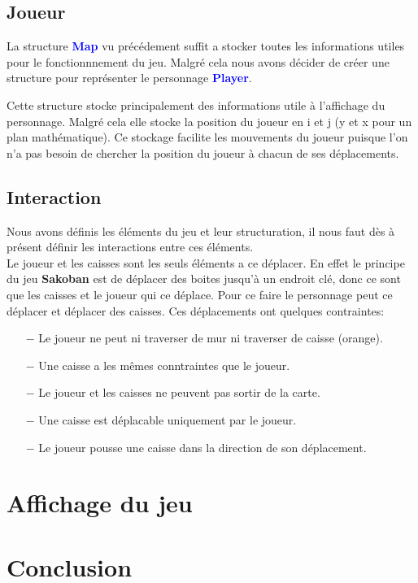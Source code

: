 \documentclass[french, 12pt]{article}
\begin{document}
    \subsection{Joueur}
        La structure \textcolor{blue}{\textbf{Map}} vu précédement suffit a stocker toutes les informations utiles pour le fonctionnnement du jeu. Malgré cela nous avons décider de créer une structure pour représenter le personnage \textcolor{blue}{\textbf{Player}}.

        Cette structure stocke principalement des informations utile à l'affichage du personnage. Malgré cela elle stocke la position du joueur en i et j (y et x pour un plan mathématique). Ce stockage facilite les mouvements du joueur puisque l'on n'a pas besoin de chercher la position du joueur à chacun de ses déplacements.

    \subsection{Interaction}
        Nous avons définis les éléments du jeu et leur structuration, il nous faut dès à présent définir les interactions entre ces éléments.
        \\
        Le joueur et les caisses sont les seuls éléments a ce déplacer. En effet le principe du jeu \textbf{Sakoban} est de déplacer des boites jusqu'à un endroit clé, donc ce sont que les caisses et le joueur qui ce déplace. Pour ce faire le personnage peut ce déplacer et déplacer des caisses. Ces déplacements ont quelques contraintes:

        \begin{itemize}
            \item[$-$] Le joueur ne peut ni traverser de mur ni traverser de caisse (orange).
            \item[$-$] Une caisse a les mêmes conntraintes que le joueur.
            \item[$-$] Le joueur et les caisses ne peuvent pas sortir de la carte.
            \item[$-$] Une caisse est déplacable uniquement par le joueur.
            \item[$-$] Le joueur pousse une caisse dans la direction de son déplacement.
        \end{itemize}


\section{Affichage du jeu}

\section{Conclusion}
\end{document}
